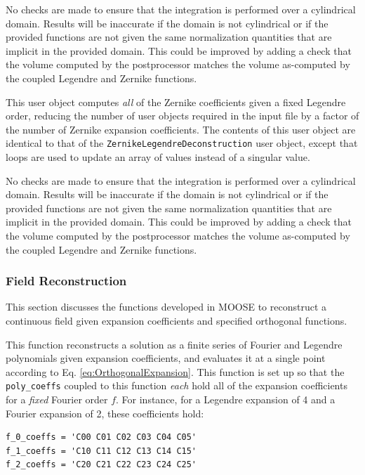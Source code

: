 \documentclass[10pt]{article}
\newcounter{subsubsubsection}[subsubsection]
\numberwithin{equation}{section} %
\begin{document}
\color{magenta}
No checks are made to ensure that the integration is performed over a cylindrical domain. Results will be inaccurate if the domain is not cylindrical or if the provided functions are not given the same normalization quantities that are implicit in the provided domain. This could be improved by adding a check that the volume computed by the postprocessor matches the volume as-computed by the coupled Legendre and Zernike functions.
\color{black}

This user object computes {\it all} of the Zernike coefficients given a fixed Legendre order, reducing the number of user objects required in the input file by a factor of the number of Zernike expansion coefficients. The contents of this user object are identical to that of the {\tt ZernikeLegendreDeconstruction} user object, except that loops are used to update an array of values instead of a singular value.

\color{magenta}
No checks are made to ensure that the integration is performed over a cylindrical domain. Results will be inaccurate if the domain is not cylindrical or if the provided functions are not given the same normalization quantities that are implicit in the provided domain. This could be improved by adding a check that the volume computed by the postprocessor matches the volume as-computed by the coupled Legendre and Zernike functions.
\color{black}

\subsubsection{Field Reconstruction}
This section discusses the functions developed in MOOSE to reconstruct a continuous field given expansion coefficients and specified orthogonal functions.

This function reconstructs a solution as a finite series of Fourier and Legendre polynomials given expansion coefficients, and evaluates it at a single point according to Eq. \eqref{eq:OrthogonalExpansion}. This function is set up so that the {\tt poly\_coeffs} coupled to this function {\it each} hold all of the expansion coefficients for a {\it fixed} Fourier order \(f\). For instance, for a Legendre expansion of 4 and a Fourier expansion of 2, these coefficients hold:

\begin{lstlisting}
f_0_coeffs = 'C00 C01 C02 C03 C04 C05'
f_1_coeffs = 'C10 C11 C12 C13 C14 C15'
f_2_coeffs = 'C20 C21 C22 C23 C24 C25'
\end{lstlisting}
\end{document}
